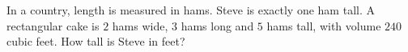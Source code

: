 In a country, length is measured in hams. Steve is exactly one ham tall. A rectangular cake is $2$ hams wide, $3$ hams long and $5$ hams tall, with volume $240$ cubic feet. How tall is Steve in feet?
